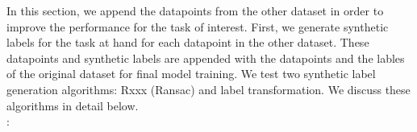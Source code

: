 \documentclass{article}
\begin{document}
In this section, we append the datapoints from the other dataset in order to improve the performance for the task of interest.
First, we generate synthetic labels for the task at hand for each datapoint in the other dataset.
These datapoints and synthetic labels are appended with the datapoints and the lables of the original dataset for final model training.
We test two synthetic label generation algorithms: Rxxx (Ransac) and label transformation.
We discuss these algorithms in detail below.
\\

:
\end{document}
